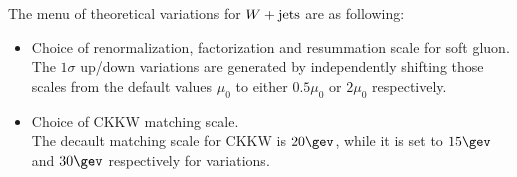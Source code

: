 The menu of theoretical variations for $W+\mathrm{jets}$ are as following:
\begin{itemize}
\item Choice of renormalization, factorization and resummation scale for soft gluon. \\
The $1\sigma$ up/down variations are generated by independently shifting those scales from the default values $\mu_0$ to either $0.5\mu_0$ or $2\mu_0$ respectively.  

\item Choice of CKKW matching scale.\\
The decault matching scale for CKKW is $20\gev$, while it is set to $15\gev$ and $30\gev$ respectively for variations. \\
\end{itemize} 



